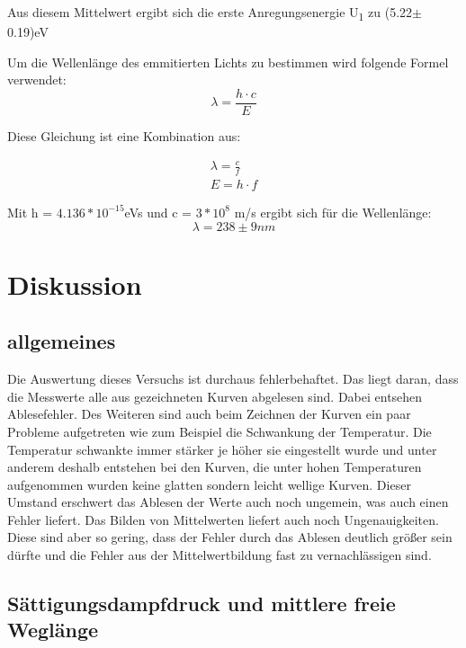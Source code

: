 \noindent Aus diesem Mittelwert ergibt sich die erste Anregungsenergie U\textsubscript{1} zu (5.22$\pm$0.19)eV

\noindent Um die Wellenlänge des emmitierten Lichts zu bestimmen wird folgende Formel verwendet:
\begin{equation}
    \lambda = \frac{h\cdot c}{E}
\end{equation}

\noindent Diese Gleichung ist eine Kombination aus:

\begin{align}
    \lambda = \frac{c}{f} \nonumber \\
    E = h \cdot f  \nonumber
\end{align}

\noindent Mit h = $4.136 * 10^{-15}$eVs und c =  $3*10^8$ m/s ergibt sich für die Wellenlänge:
\begin{displaymath}
    \lambda = 238\pm 9 nm
\end{displaymath}   

\section{Diskussion}

\subsection{allgemeines}

Die Auswertung dieses Versuchs ist durchaus fehlerbehaftet. Das liegt daran, dass die Messwerte alle aus gezeichneten Kurven abgelesen sind. Dabei entsehen Ablesefehler. Des Weiteren sind auch beim Zeichnen der Kurven ein paar Probleme aufgetreten wie zum Beispiel die Schwankung der Temperatur. Die Temperatur schwankte immer stärker je höher sie eingestellt wurde und unter anderem deshalb entstehen bei den Kurven, die unter hohen Temperaturen aufgenommen wurden keine glatten sondern leicht wellige Kurven. Dieser Umstand erschwert das Ablesen der Werte auch noch ungemein, was auch einen Fehler liefert. Das Bilden von Mittelwerten liefert auch noch Ungenauigkeiten. Diese sind aber so gering, dass der Fehler durch das Ablesen deutlich größer sein dürfte und die Fehler aus der Mittelwertbildung fast zu vernachlässigen sind.


\subsection{Sättigungsdampfdruck und mittlere freie Weglänge}

